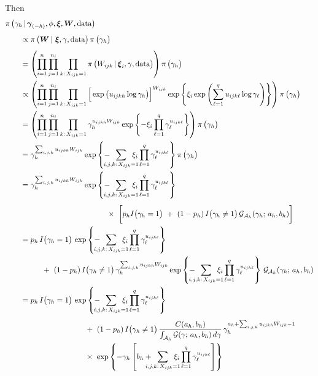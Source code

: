 \documentclass[11pt]{article}
\renewcommand{\vec}{\boldsymbol}
\newcommand{\barS}{\,|\,}
\newcommand{\ind}{I}
\newcommand{\gammaExpr}{ -\hspace{2mm} \sum_{\mathclap{i,j,k{:}\, X_{ijk}=1}} \hspace{2mm} \xi_i \prod_{\ell=1}^q \gamma_\ell^{ u_{ijk\ell} } }
\begin{document}
\begin{enumerate}[label=Step \arabic*., leftmargin=13mm]
Then
\begin{align*} \MoveEqLeft
\pi\, \big( \gamma_h \barS \vec{\gamma}_{(-h)}, \phi, \vec{\xi}, \vec{W}, \text{data} \big) \\[1ex]
& \propto \pi\, \big( \vec{W} \barS\, \vec{\xi}, \gamma, \text{data} \big)\, \pi\,\big( \gamma_h \big) \\[1ex]
&= \left( \prod_{i=1}^{n} \prod_{j=1}^{n_i} \prod_{k{:}\, X_{ijk} = 1} \pi\, \big( W_{ijk} \barS \vec{\xi}_i, \gamma, \text{data} \big) \right) \pi\, \big( \gamma_h \big) \\
&\propto \left( \prod_{i=1}^{n} \prod_{j=1}^{n_i} \prod_{k{:}\, X_{ijk} = 1} \Big[ \exp\big( u_{ijkh} \log \gamma_h \big) \Big]^{W_{ijk}} \exp\left\{ \xi_i \exp\left( \sum_{\ell=1}^q u_{ijk\ell} \log \gamma_{\ell} \right) \right\} \right) \pi\, \big( \gamma_h \big) \\
&= \left( \prod_{i=1}^{n} \prod_{j=1}^{n_i} \prod_{k{:}\, X_{ijk} = 1} \gamma_h^{ u_{ijkh} W_{ijk} } \exp\left\{ -\xi_i \prod_{\ell=1}^q \gamma_\ell^{ u_{ijk\ell} } \right\} \right) \pi\, \big( \gamma_h \big) \\
&= \gamma_h^{ \sum_{i,j,k} u_{ijkh} W_{ijk} } \exp\left\{ \gammaExpr \right\} \pi\, \big( \gamma_h \big) \\
&= \gamma_h^{ \sum_{i,j,k} u_{ijkh} W_{ijk} } \exp\left\{ \gammaExpr \right\} \\[1ex]
& \hspace{40mm} \times~ \bigg[ p_h \ind\big( \gamma_h = 1 \big) ~+~ (1 - p_h)\, \ind\big( \gamma_h \ne 1 \big)\, \mathcal{G}_{\mathcal{A}_h} (\gamma_h;\, a_h,b_h) \bigg] \\
&= p_h\, \ind\big( \gamma_h = 1 \big)\, \exp\left\{ \gammaExpr \right\} \\
& \hspace{10mm} +~ (1 - p_h)\, \ind\big(\gamma_h \ne 1 \big)\, \gamma_h^{ \sum_{i,j,k} u_{ijkh} W_{ijk} } \exp\left\{ \gammaExpr \right\} \, \mathcal{G}_{\mathcal{A}_h} (\gamma_h;\, a_h,b_h) \\
&= p_h\, \ind\big( \gamma_h = 1 \big)\, \exp\left\{ \gammaExpr \right\} \\[1ex]
& \hspace{30mm} +~ (1 - p_h)\, \ind\big(\gamma_h \ne 1 \big)\, \frac{ C(a_h,b_h) }{ \int_{\mathcal{A}_h} \mathcal{G}(\gamma;\, a_h,b_h)\, d\gamma }\, \gamma_h^{ a_h + \sum_{i,j,k} u_{ijkh} W_{ijk} - 1 } \\
& \hspace{30mm} \times~ \exp\left\{ -\gamma_h \left[ b_h +\hspace{2mm} \sum_{\mathclap{i,j,k{:}\, X_{ijk}=1}} \hspace{2mm} \xi_i \prod_{\ell=1}^q \gamma_\ell^{ u_{ijk\ell} } \right] \right\} \\[2ex]

\end{align*}
\end{enumerate}
\end{document}
